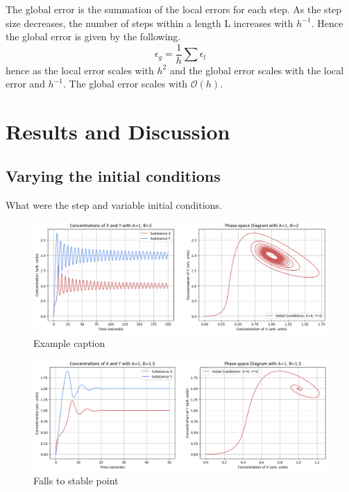 \documentclass[reprint, amsmath, amssymb, aps]{revtex4-2}
\begin{document}
The global error is the summation of the local errors for each step. As the step size decreases, the number of steps within a length L increases with $h^{-1}$. Hence the global error is given by the following.
\begin{equation}
	\epsilon_g = \frac{1}{h} \sum \epsilon_l
\end{equation}hence as the local error scales with $h^2$ and the global error scales with the local error and $h^{-1}$. The global error scales with $\mathcal{O}(h)$.

\section{Results and Discussion}

\subsection{Varying the initial conditions}
What were the step and variable initial conditions.


\begin{figure}
\includegraphics[width=2\columnwidth]{combinedPlot.png}
\caption{\label{fig:combinedPlot}Example caption}
\end{figure}

\begin{figure}
\includegraphics[width=2\columnwidth]{combinedPlot_fallToStable.png}
\caption{\label{fig:combinedPlot}Falls to stable point}
\end{figure}
\end{document}
